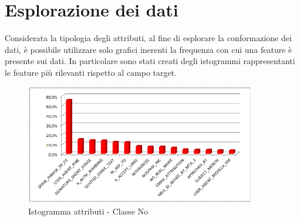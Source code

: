 %
%
%
%

\section{Esplorazione dei dati}
Considerata la tipologia degli attributi, al fine di esplorare la conformazione dei dati, è possibile utilizzare solo grafici inerenti la frequenza con cui una feature è presente sui dati. In particolare sono stati creati degli istogrammi rappresentanti le feature più rilevanti rispetto al campo target.
\begin{figure}[hbtp]
 	\centering
 	\includegraphics[width=0.9\textwidth]{./images/Histogram_No.png}
 	\caption{Istogramma attributi - Classe No}
 	\label{NoHist}
\end{figure}

